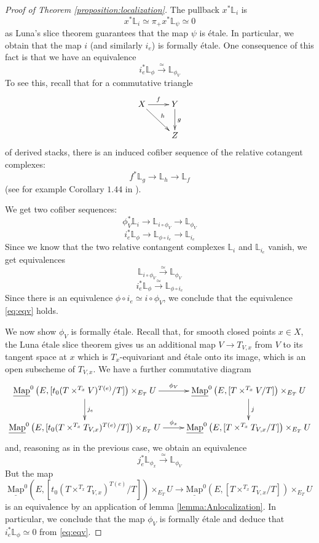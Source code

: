 \documentclass[11pt,letterpaper]{amsart}
\newcommand{\bL}{\mathbb{L}}
\newcommand{\Mapo}[2]{\underline{\mathrm{Map}}^{0}\left (#1,#2\right )}
\begin{document}
\begin{proof}[Proof of Theorem  \ref{proposition:localization}]
The pullback $x^\ast\bL_{i}$ is
$$x^\ast\bL_{i}\simeq \pi_+x^\ast\bL_{\psi}\simeq 0$$
as Luna's slice theorem guarantees that the map $\psi$ is étale.
In particular, we obtain that the map $i$ (and similarly $i_e$) is formally étale. One consequence of this fact is that we have an equivalence 
\begin{equation}\label{eq:eqv}
i_e^\ast\bL_{\phi}\xrightarrow{\simeq}\bL_{\phi_V}
\end{equation}
To see this, recall that for a commutative triangle
$$
\xymatrix{
X \ar[r]^{f}\ar[dr]^{h} & Y\ar[d]^{g} \\
 & Z
}
$$
of derived stacks, there is an induced cofiber   sequence of the relative cotangent complexes:
$$
f^{\ast}\bL_{g}\rightarrow\bL_{h}\rightarrow\bL_{f}
$$
(see for example Corollary $1.44$ in \cite{DAGIV}).

We get two cofiber sequences:
$$\phi_V^\ast\bL_i\rightarrow\bL_{i\circ\phi_V}\rightarrow\bL_{\phi_V}$$
$$i_e^\ast\bL_{\phi}\rightarrow\bL_{\phi\circ i_e}\rightarrow\bL_{i_e}$$
Since we know that the two relative contangent complexes $\bL_i$ and $\bL_{i_e}$ vanish, we get equivalences
$$\bL_{i\circ\phi_V}\xrightarrow{\simeq}\bL_{\phi_V}$$
$$i_e^\ast\bL_{\phi}\xrightarrow{\simeq}\bL_{\phi\circ i_e}$$
Since there is an equivalence $\phi\circ i_e\simeq i\circ\phi_V$, we conclude that the equivalence \eqref{eq:eqv} holds.

We now show $\phi_V$ is formally étale. Recall that, for smooth closed points $x\in X$, the Luna étale slice theorem gives us an additional map $V\rightarrow T_{V,x}$ from $V$ to its tangent space at $x$ which is $T_x$-equivariant and étale onto its image, which is an open subscheme of $T_{V,x}$. We have a further commutative diagram
$$
\xymatrix{
\Mapo{E}{[t_0(T\times^{T_x}V)^{T(e)}/T]}\times_{E_T}U \ar[r]^-{\phi_V} \ar[d]^{j_e} & \Mapo{E}{[T\times^{T_x}V/T]}\times_{E_T}U\ar[d]^{j}\\
\Mapo{E}{[t_0(T\times^{T_x}T_{V,x})^{T(e)}/T]}\times_{E_T}U \ar[r]^-{\phi_x}  & \Mapo{E}{[T\times^{T_x}T_{V,x}/T]}\times_{E_T}U
}
$$
and, reasoning as in the previous case, we obtain an equivalence 
$$j_e^\ast\bL_{\phi_x}\xrightarrow{\simeq}\bL_{\phi_V}$$
But the map
$$
\Mapo{E}{[t_0(T\times^{T_x}T_{V,x})^{T(e)}/T]}\times_{E_T}U \rightarrow \Mapo{E}{[T\times^{T_x}T_{V,x}/T]}\times_{E_T}U
$$
is an equivalence by an application of lemma \ref{lemma:Anlocalization}. In particular, we conclude that the map $\phi_V$ is formally étale and deduce that $i_e^\ast\bL_{\phi} \simeq 0$ from \eqref{eq:eqv}.
 

\end{proof}
\end{document}
